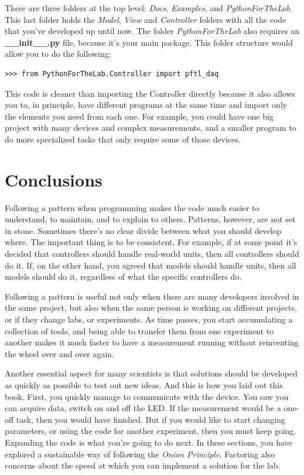 There are three folders at the top level: \emph{Docs}, \emph{Examples}, and \emph{PythonForTheLab}. This last folder holds the \emph{Model}, \emph{View} and \emph{Controller} folders with all the code that you've developed up until now. The folder \emph{PythonForTheLab} also requires an \textbf{\_\_init\_\_.py} file, because it's your main package. This folder structure would allow you to do the following:

\begin{verbatim}
>>> from PythonForTheLab.Controller import pftl_daq
\end{verbatim}

This code is cleaner than importing the Controller directly because it also allows you to, in principle, have different programs at the same time and import only the elements you need from each one. For example, you could have one big project with many devices and complex measurements, and a smaller program to do more specialized tasks that only require some of those devices.

\section{Conclusions}\label{sec:layout-conclusions}
Following a pattern when programming makes the code much easier to understand, to maintain, and to explain to others. Patterns, however, are not set in stone. Sometimes there's no clear divide between what you should develop where. The important thing is to be consistent. For example, if at some point it's decided that controllers should handle real-world units, then all controllers should do it. If, on the other hand, you agreed that models should handle units, then all models should do it, regardless of what the specific controllers do.

Following a pattern is useful not only when there are many developers involved in the same project, but also when the same person is working on different projects, or if they change labs, or experiments. As time passes, you start accumulating a collection of tools, and being able to transfer them from one experiment to another makes it much faster to have a measurement running without reinventing the wheel over and over again.

Another essential aspect for many scientists is that solutions should be developed as quickly as possible to test out new ideas. And this is how you laid out this book. First, you quickly manage to communicate with the device. You saw you can acquire data, switch on and off the LED. If the measurement would be a one-off task, then you would have finished. But if you would like to start changing parameters, or using the code for another experiment, then you must keep going. Expanding the code is what you're going to do next. In these sections, you have explored a sustainable way of following the \emph{Onion Principle}. Factoring also concerns about the speed at which you can implement a solution for the lab.

